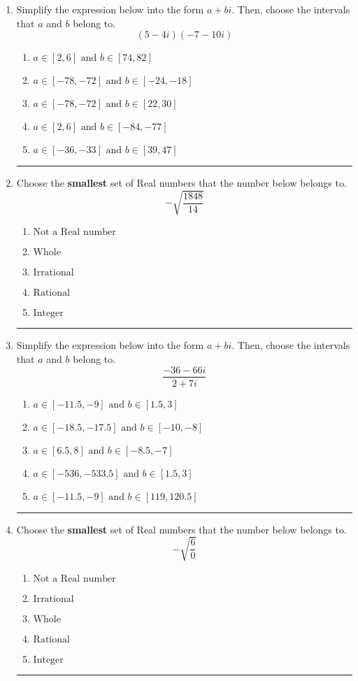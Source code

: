 \documentclass[14pt]{extbook}
\newcommand{\litem}[1]{\item#1\hspace*{-1cm}\rule{\textwidth}{0.4pt}}
\begin{document}
\begin{enumerate}
{\begin{enumerate}[label=\Alph*.]
\end{enumerate} }
\litem{
Simplify the expression below into the form $a+bi$. Then, choose the intervals that $a$ and $b$ belong to.\[ (5 - 4 i)(-7 - 10 i) \]\begin{enumerate}[label=\Alph*.]
\item \( a \in [2, 6] \text{ and } b \in [74, 82] \)
\item \( a \in [-78, -72] \text{ and } b \in [-24, -18] \)
\item \( a \in [-78, -72] \text{ and } b \in [22, 30] \)
\item \( a \in [2, 6] \text{ and } b \in [-84, -77] \)
\item \( a \in [-36, -33] \text{ and } b \in [39, 47] \)

\end{enumerate} }
\litem{
Choose the \textbf{smallest} set of Real numbers that the number below belongs to.\[ -\sqrt{\frac{1848}{14}} \]\begin{enumerate}[label=\Alph*.]
\item \( \text{Not a Real number} \)
\item \( \text{Whole} \)
\item \( \text{Irrational} \)
\item \( \text{Rational} \)
\item \( \text{Integer} \)

\end{enumerate} }
\litem{
Simplify the expression below into the form $a+bi$. Then, choose the intervals that $a$ and $b$ belong to.\[ \frac{-36 - 66 i}{2 + 7 i} \]\begin{enumerate}[label=\Alph*.]
\item \( a \in [-11.5, -9] \text{ and } b \in [1.5, 3] \)
\item \( a \in [-18.5, -17.5] \text{ and } b \in [-10, -8] \)
\item \( a \in [6.5, 8] \text{ and } b \in [-8.5, -7] \)
\item \( a \in [-536, -533.5] \text{ and } b \in [1.5, 3] \)
\item \( a \in [-11.5, -9] \text{ and } b \in [119, 120.5] \)

\end{enumerate} }
\litem{
Choose the \textbf{smallest} set of Real numbers that the number below belongs to.\[ -\sqrt{\frac{6}{0}} \]\begin{enumerate}[label=\Alph*.]
\item \( \text{Not a Real number} \)
\item \( \text{Irrational} \)
\item \( \text{Whole} \)
\item \( \text{Rational} \)
\item \( \text{Integer} \)


\end{enumerate}}
\end{enumerate}
\end{document}
